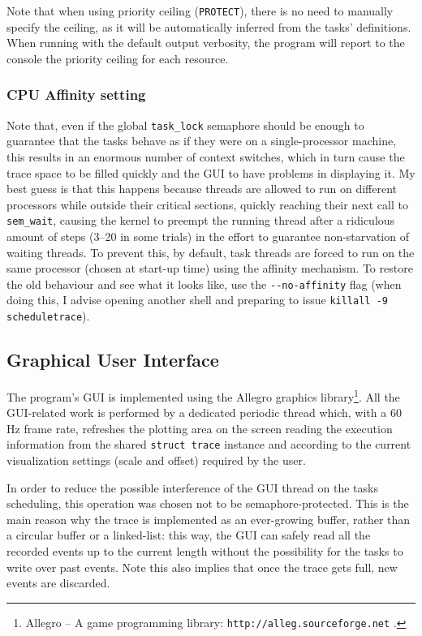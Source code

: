 \documentclass[paper=a4, fontsize=11pt]{scrartcl}
\newcommand{\mono}[1]{\texttt{#1}}
\numberwithin{equation}{section}        %
\numberwithin{figure}{section}          %
\numberwithin{table}{section}               %
\numberwithin{fragment}{section}
\begin{document}
Note that when using priority ceiling (\mono{PROTECT}), there is no need to manually specify the ceiling, as it will be automatically inferred from the tasks' definitions. When running with the default output verbosity, the program will report to the console the priority ceiling for each resource.


\subsubsection{CPU Affinity setting}\label{sec:tasks:affinity}
Note that, even if the global \mono{task\_lock} semaphore should be enough to guarantee that the tasks behave as if they were on a single-processor machine, this results in an enormous number of context switches, which in turn cause the trace space to be filled quickly and the GUI to have problems in displaying it.
My best guess is that this happens because threads are allowed to run on different processors while outside their critical sections, quickly reaching their next call to \mono{sem\_wait}, causing the kernel to preempt the running thread after a ridiculous amount of steps (3--20 in some trials) in the effort to guarantee non-starvation of waiting threads. To prevent this, by default, task threads are forced to run on the same processor (chosen at start-up time) using the affinity mechanism\cite{man-pthread-affinity}\cite{man-affinity}.
To restore the old behaviour and see what it looks like, use the \mono{-{}-no-affinity} flag (when doing this, I advise opening another shell and preparing to issue \mono{killall -9 scheduletrace}).


\subsection{Graphical User Interface}\label{sec:gui}
The program's GUI is implemented using the Allegro graphics library\footnote{Allegro -- A game programming library: \mono{http://alleg.sourceforge.net} .}.
All the GUI-related work is performed by a dedicated periodic thread which, with a 60 Hz frame rate, refreshes the plotting area on the screen reading the execution information from the shared \mono{struct trace} instance and according to the current visualization settings (scale and offset) required by the user.

In order to reduce the possible interference of the GUI thread on the tasks scheduling, this operation was chosen not to be semaphore-protected. This is the main reason why the trace is implemented as an ever-growing buffer, rather than a circular buffer or a linked-list: this way, the GUI can safely read all the recorded events up to the current length without the possibility for the tasks to write over past events. Note this also implies that once the trace gets full, new events are discarded.
\end{document}
